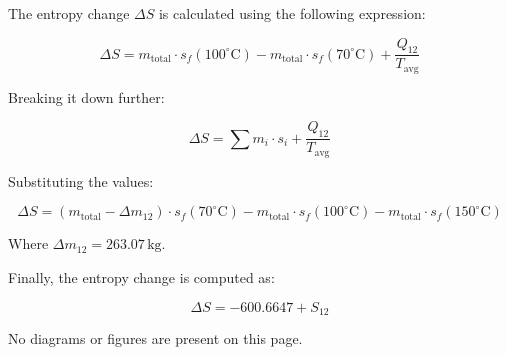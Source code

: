 The entropy change \( \Delta S \) is calculated using the following expression:  

\[
\Delta S = m_{\text{total}} \cdot s_f(100^\circ\text{C}) - m_{\text{total}} \cdot s_f(70^\circ\text{C}) + \frac{Q_{12}}{T_{\text{avg}}}
\]

Breaking it down further:  

\[
\Delta S = \sum m_i \cdot s_i + \frac{Q_{12}}{T_{\text{avg}}}
\]

Substituting the values:  

\[
\Delta S = (m_{\text{total}} - \Delta m_{12}) \cdot s_f(70^\circ\text{C}) - m_{\text{total}} \cdot s_f(100^\circ\text{C}) - m_{\text{total}} \cdot s_f(150^\circ\text{C})
\]

Where \( \Delta m_{12} = 263.07 \, \text{kg} \).  

Finally, the entropy change is computed as:  

\[
\Delta S = -600.6647 + S_{12}
\]  

No diagrams or figures are present on this page.